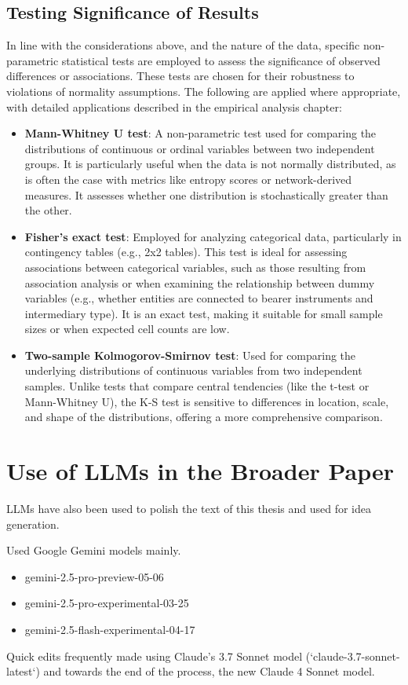 \subsection{Testing Significance of Results}
\label{subsec:significance_testing}
In line with the considerations above, and the nature of the data, specific non-parametric statistical tests are employed to assess the significance of observed differences or associations. These tests are chosen for their robustness to violations of normality assumptions. The following are applied where appropriate, with detailed applications described in the empirical analysis chapter:
\begin{itemize}
    \item \textbf{Mann-Whitney U test}: A non-parametric test used for comparing the distributions of continuous or ordinal variables between two independent groups. It is particularly useful when the data is not normally distributed, as is often the case with metrics like entropy scores or network-derived measures. It assesses whether one distribution is stochastically greater than the other.
    \item \textbf{Fisher's exact test}: Employed for analyzing categorical data, particularly in contingency tables (e.g., 2x2 tables). This test is ideal for assessing associations between categorical variables, such as those resulting from association analysis or when examining the relationship between dummy variables (e.g., whether entities are connected to bearer instruments and intermediary type). It is an exact test, making it suitable for small sample sizes or when expected cell counts are low.
    \item \textbf{Two-sample Kolmogorov-Smirnov test}: Used for comparing the underlying distributions of continuous variables from two independent samples. Unlike tests that compare central tendencies (like the t-test or Mann-Whitney U), the K-S test is sensitive to differences in location, scale, and shape of the distributions, offering a more comprehensive comparison.
\end{itemize}

\section{Use of LLMs in the Broader Paper}
\label{sec:3_5_llms}

LLMs have also been used to polish the text of this thesis and used for idea generation.

Used Google Gemini models mainly.
\begin{itemize}
    \item gemini-2.5-pro-preview-05-06
    \item gemini-2.5-pro-experimental-03-25
    \item gemini-2.5-flash-experimental-04-17
\end{itemize}

Quick edits frequently made using Claude's 3.7 Sonnet model (`claude-3.7-sonnet-latest`) and towards the end of the process, the new Claude 4 Sonnet model.




